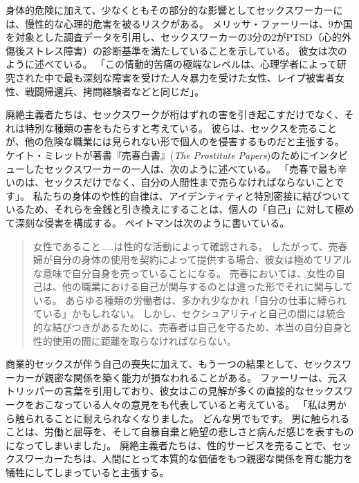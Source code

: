 \documentclass[paper=a4,book,openany]{jlreq} \usepackage{mystyle}
\begin{document}
身体的危険に加えて、少なくともその部分的な影響としてセックスワーカーには、慢性的な心理的危害を被るリスクがある。
メリッサ・ファーリーは、9か国を対象とした調査データを引用し、セックスワーカーの3分の2がPTSD（心的外傷後ストレス障害）の診断基準を満たしていることを示している。
彼女は次のように述べている。
「この情動的苦痛の極端なレベルは、心理学者によって研究された中で最も深刻な障害を受けた人々{\DDASH}暴力を受けた女性、レイプ被害者女性、戦闘帰還兵、拷問経験者など{\DDASH}と同じだ」\citep[p.100]{farley18:_risks_prost}。

廃絶主義者たちは、セックスワークが桁はずれの害を引き起こすだけでなく、それは特別な種類の害をもたらすと考えている。
彼らは、セックスを売ることが、他の危険な職業には見られない形で個人のを侵害するものだと主張する。
ケイト・ミレットが著書『売春白書』(\emph{The Prostitute Papers})のためにインタビューしたセックスワーカーの一人は、次のように述べている。
「売春で最も辛いのは、セックスだけでなく、自分の人間性まで売らなければならないことです」\citep[p.84]{millett76:_prost_paper}。
私たちの身体のや性的自律は、アイデンティティと特別密接に結びついているため、それらを金銭と引き換えにすることは、個人の「自己」に対して極めて深刻な侵害を構成する。
ペイトマンは次のように書いている。

\begin{quote}
女性であること……は性的な活動によって確認される。
したがって、売春婦が自分の身体の使用を契約によって提供する場合、彼女は極めてリアルな意味で自分自身を売っていることになる。
売春においては、女性の自己は、他の職業における自己が関与するのとは違った形でそれに関与している。
あらゆる種類の労働者は、多かれ少なかれ「自分の仕事に縛られている」かもしれない。
しかし、セクシュアリティと自己の間には統合的な結びつきがあるために、売春者は自己を守るため、本当の自分自身と性的使用の間に距離を取らなければならない。
\citep{pateman88:_sexual_contr}
\end{quote}

商業的セックスが伴う自己の喪失に加えて、もう一つの結果として、セックスワーカーが親密な関係を築く能力が損なわれることがある。
ファーリーは、元ストリッパーの言葉を引用しており、彼女はこの見解が多くの直接的なセックスワークをおこなっている人々の意見をも代表していると考えている。
「私は男から触られることに耐えられなくなりました。
どんな男でもです。
男に触られることは、労働と屈辱を、そして自暴自棄と絶望の悲しさと病んだ感じを表すものになってしまいました」\citep{farley13:_prost_liber_slaver}。
廃絶主義者たちは、性的サービスを売ることで、セックスワーカーたちは、人間にとって本質的な価値をもつ親密な関係を育む能力を犠牲にしてしまっていると主張する。
\end{document}
